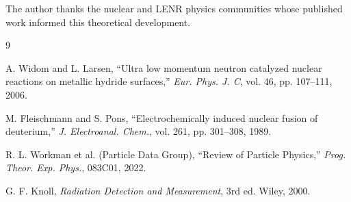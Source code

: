 \documentclass[12pt,a4paper]{article}
\begin{document}
The author thanks the nuclear and LENR physics communities whose
published work informed this theoretical development.

\begin{thebibliography}{9}

  A. Widom and L. Larsen,
  ``Ultra low momentum neutron catalyzed nuclear reactions on metallic
  hydride surfaces,''
  \textit{Eur. Phys. J. C}, vol. 46, pp. 107--111, 2006.

  M. Fleischmann and S. Pons,
  ``Electrochemically induced nuclear fusion of deuterium,''
  \textit{J. Electroanal. Chem.}, vol. 261, pp. 301--308, 1989.

  R. L. Workman et al. (Particle Data Group),
  ``Review of Particle Physics,''
  \textit{Prog. Theor. Exp. Phys.}, 083C01, 2022.

  G. F. Knoll,
  \textit{Radiation Detection and Measurement}, 3rd ed.
  Wiley, 2000.

\end{thebibliography}
\end{document}
